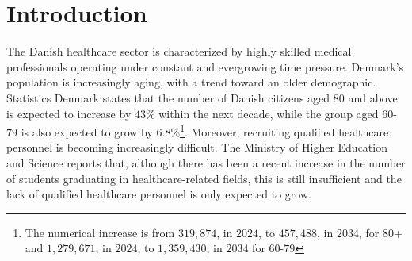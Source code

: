 \section{Introduction}
The Danish healthcare sector is characterized by highly skilled medical professionals operating under constant and evergrowing time pressure.
Denmark's population is increasingly aging, with a trend toward an older demographic. Statistics Denmark\cite{dst-older-pop} states that the number of Danish citizens aged $80$ and above is expected to increase by $43$\% within the next decade, while the group aged $60$-$79$ is also expected to grow by $6.8$\%\footnote{The numerical increase is from $319,874$, in $2024$, to $457,488$, in $2034$, for $80$+ and $1,279,671$, in $2024$, to $1,359,430$, in $2034$ for $60$-$79$}. Moreover, recruiting qualified healthcare personnel is becoming increasingly difficult. The Ministry of Higher Education and Science\cite{MoHEaS-healthcare-rectruitment} reports that, although there has been a recent increase in the number of students graduating in healthcare-related fields, this is still insufficient and the lack of qualified healthcare personnel is only expected to grow.   
